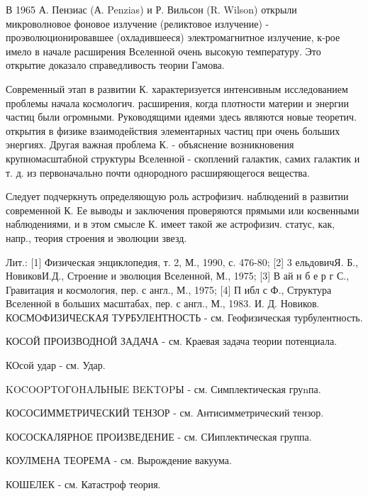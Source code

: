 \documentclass[10pt]{article}
\begin{document}
В 1965 А. Пензиас (А. Penzias) и Р. Вильсон (R. Wilson) открыли микроволновое фоновое излучение (реликтовое излучение) - проэволюционировавшее (охладившееся) электромагнитное излучение, к-рое имело в начале расширения Вселенной очень высокую температуру. Это открытие доказало справедливость теории Гамова.



Современный этап в развитии К. характеризуется интенсивным исследованием проблемы начала космологич. расширения, когда плотности материи и энергии частиц были огромными. Руководящими идеями здесь являются новые теоретич. открытия в физике взаимодействия элементарных частиц при очень больших энергиях. Другая важная проблема К. - объяснение возникновения крупномасштабной структуры Вселенной - скоплений галактик, самих галактик и т. д. из первоначально почти однородного расширяющегося вещества.



Следует подчеркнуть определяющую роль астрофизич. наблюдений в развитии современной К. Ее выводы и заключения проверяются прямыми или косвенными наблюдениями, и в этом смысле К. имеет такой же астрофизич. статус, как, напр., теория строения и эволюции звезд.



Лит.: [1] Физическая энциклопедия, т. 2, М., 1990, с. 476-80; [2] 3 ельдовичЯ. Б., НовиковИ.Д., Строение и эволюция Вселенной, М., 1975; [3] В ай н б е р г С., Гравитация и космология, пер. с англ., М., 1975; [4] П ибл с Ф., Структура Вселенной в больших масштабах, пер. с англ., М., 1983. И. Д. Новиков. КОСМОФИЗИЧЕСКАЯ ТУРБУЛЕНТНОСТЬ - см. Геофизическая турбулентность.



КОСОЙ ПРОИЗВОДНОЙ ЗАДАЧА - см. Краевая задача теории потенциала.



КОсой удар - см. Удар.



KOCOOPTOГOHAЛЬHЫE BEKTOPЫ - см. Симплектическая груnпа.



КОСОСИММЕТРИЧЕСКИЙ ТЕНЗОР - см. Антисимметрический тензор.



КОСОСКАЛЯРНОЕ ПРОИЗВЕДЕНИЕ - см. СИиплектическая группа.



КОУЛМЕНА ТЕОРЕМА - см. Вырождение вакуума.



КОШЕЛЕК - см. Катастроф теория.
\end{document}
